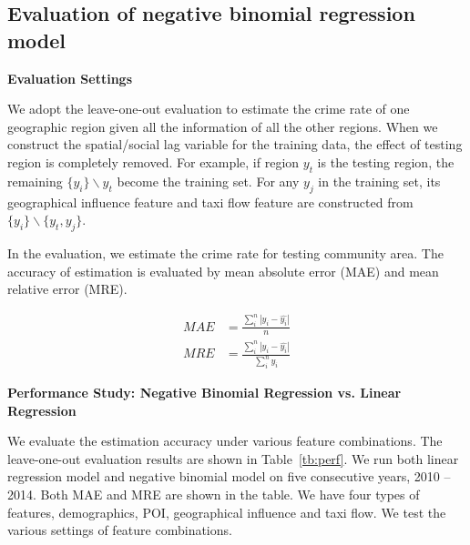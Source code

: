 \subsection{Evaluation of negative binomial regression model}



\textbf{Evaluation Settings}

We adopt the leave-one-out evaluation to estimate the crime rate of one geographic region given all the information of all the other regions. When we construct the spatial/social lag variable for the training data, the effect of testing region is completely removed. For example, if region $y_t$ is the testing region, the remaining $\{y_i\} \backslash y_t$ become the training set. For any $y_j$ in the training set, its geographical influence feature and taxi flow feature are constructed from $\{y_i\} \backslash \{y_t, y_j\}$.


In the evaluation, we estimate the crime rate for testing community area. The accuracy of estimation is evaluated by mean absolute error (MAE) and mean relative error (MRE).

\begin{align}
MAE & = \frac{\sum_i^n |y_i - \hat{y_i}| }{n} \\
MRE & = \frac{\sum_i^n |y_i - \hat{y_i}|} {\sum_i^n y_i }
\end{align}


\textbf{Performance Study: Negative Binomial Regression vs. Linear Regression}


We evaluate the estimation accuracy under various feature combinations. The leave-one-out evaluation results are shown in Table~\ref{tb:perf}.  We run both linear regression model and negative binomial model on five consecutive years, 2010 -- 2014. Both MAE and MRE are shown in the table. We have four types of features, demographics, POI, geographical influence and taxi flow. We test the various settings of feature combinations.





